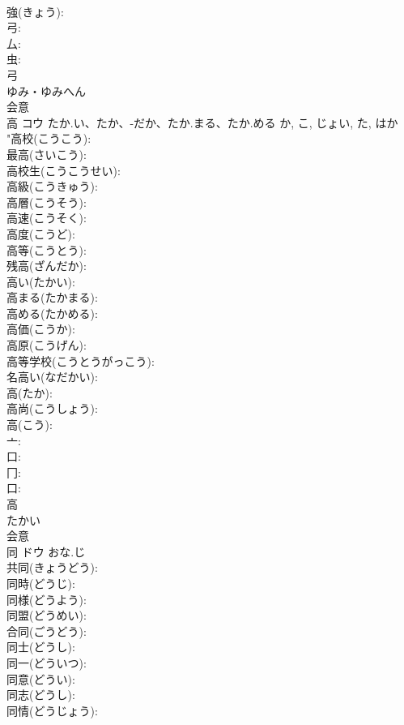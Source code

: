 \documentclass[8pt]{extreport}
\begin{document}
\begin{CJK}{UTF8}{min}
\\	強(きょう): 
\\	弓: 
\\	厶: 
\\	虫: 
\\	弓	
\\	ゆみ・ゆみへん	
\\	会意 
\\	高	コウ	たか.い、たか、-だか、たか.まる、たか.める	か, こ, じょい, た, はか	
\\	"高校(こうこう): 
\\	最高(さいこう): 
\\	高校生(こうこうせい): 
\\	高級(こうきゅう): 
\\	高層(こうそう): 
\\	高速(こうそく): 
\\	高度(こうど): 
\\	高等(こうとう): 
\\	残高(ざんだか): 
\\	高い(たかい): 
\\	高まる(たかまる): 
\\	高める(たかめる): 
\\	高価(こうか): 
\\	高原(こうげん): 
\\	高等学校(こうとうがっこう): 
\\	名高い(なだかい): 
\\	高(たか): 
\\	高尚(こうしょう): 
\\	高(こう): 
\\	亠: 
\\	口: 
\\	冂: 
\\	口: 
\\	高	
\\	たかい	
\\	会意 
\\	同	ドウ	おな.じ		
\\	共同(きょうどう): 
\\	同時(どうじ): 
\\	同様(どうよう): 
\\	同盟(どうめい): 
\\	合同(ごうどう): 
\\	同士(どうし): 
\\	同一(どういつ): 
\\	同意(どうい): 
\\	同志(どうし): 
\\	同情(どうじょう): 

\end{CJK}
\end{document}
